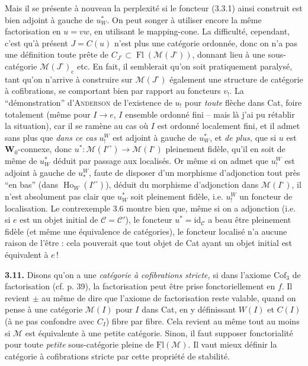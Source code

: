 \documentclass[11pt]{article}
\newcommand{\printedpage}[1]{\marginpar{\footnotesize p.~#1}}
\newcommand{\msp}[1]{\marginpar{\footnotesize [#1]}}
\newcommand{\Fl}{\operatorname{Fl}}
\newcommand{\Ho}{\operatorname{Ho}}
\newcommand{\id}{\mathrm{id}}
\newcommand{\M}{\mathcal{M}}
\begin{document}
\msp{page 67}
Mais il se présente à nouveau la perplexité si le foncteur (3.3.1) ainsi construit est bien adjoint à gauche de $u_W^*$. On peut songer à utiliser encore la même factorisation en $u = vw$, en
\printedpage{33}
utilisant le mapping-cone. La difficulté, cependant, c'est qu'à présent $J = C(u)$ n'est plus une catégorie ordonnée, donc on n'a pas une définition toute prête de $C_{J^\circ}\subset\Fl(\M(J^\circ))$, donnant lieu à une sous-catégorie $\M(J^\circ)_{\mathrm{c}}$ etc. En fait, il semblerait qu'on soit pratiquement paralysé, tant qu'on n'arrive à construire sur $\M(J^\circ)$ également une structure de catégorie à cofibrations, se comportant bien par rapport au foncteurs $v_!$. La %
“démonstration” d'\textsc{Anderson} de l'existence de $u_!$ pour \textit{toute} flèche dans Cat, foire totalement (même pour $I\longrightarrow e$, $I$ ensemble ordonné fini – mais là j'ai pu rétablir la situation), car il se ramène au cas où $I$ est ordonné localement fini, et il
\msp{page 68}
admet sans plus que \textit{dans ce cas} $u_!^W$ est adjoint à gauche de $u_W^*$, et \textit{de plus,} que si $u$ est $\mathbf{W}_0$-connexe, donc $u^* : \M(I'^\circ)\longrightarrow\M(I^\circ)$ pleinement fidèle, qu'il en soit de même de $u_W^*$ déduit par passage aux localisés. Or même si on admet que $u_!^W$ est adjoint à gauche de
$u_*^W$, faute de disposer d'un morphisme d'adjonction tout près “en bas” (dans $\Ho_W(I'^\circ)$), %
déduit du morphisme d'adjonction dans $\M(I^\circ)$, il n'est absolument pas clair que $u_W^*$ soit pleinement fidèle, i.e. $u_!^W$ un foncteur de localisation. Le contrexemple 3.6 montre bien que, même si on a adjonction (i.e. si $e$ est un objet initial de $\mathcal{C} = \mathcal{C}'$), le foncteur $u^* = \id_{\mathcal{C}}$ a beau être pleinement fidèle (et même une équivalence de catégories), le foncteur localisé n'a aucune raison de l'être : cela pouverait que tout objet de Cat ayant un objet initial %
est équivalent à $e$\,!

\msp{page 69}
\textbf{3.11.} Disons qu'on a une \textit{catégorie à cofibrations stricte,} si dans l'axiome $\mathrm{Cof}_3$ de factorisation (cf. p. 39), la factorisation peut être prise fonctoriellement en $f$. Il revient $\pm$ au même de dire que l'axiome de factorisation reste valable, quand on pense à une catégorie $\M(I)$ pour $I$ dans Cat, en y définissant $W(I)$ et $C(I)$ (à ne pas confondre avec $C_I$) fibre par fibre. Cela revient au même tout au moins si $\M$ est équivalente à une petite catégorie. Sinon, il faut supposer fonctorialité pour toute \textit{petite} sous-catégorie pleine de $\underline{\mathrm{Fl}}(\M)$. Il vaut mieux définir la catégorie à cofibrations stricte par cette propriété de stabilité.
\end{document}
